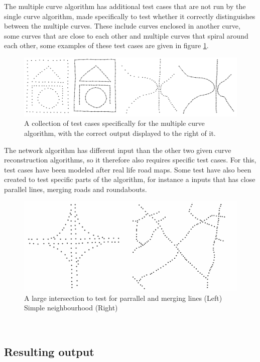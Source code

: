 \documentclass[11pt]{article}
\begin{document}
The multiple curve algorithm has additional test cases that are not run by the single curve algorithm, made specifically to test whether it correctly distinguishes between the multiple curves. These include curves enclosed in another curve, some curves that are close to each other and multiple curves that spiral around each other, some examples of these test cases are given in figure \ref{multi}.

\begin{figure}[ht!]
\centering
\includegraphics[scale=0.3]{multiInput.png}
\caption{A collection of test cases specifically for the multiple curve algorithm, with the correct output displayed to the right of it.}
\label{multi}
\end{figure}

The network algorithm has different input than the other two given curve reconstruction algorithms, so it therefore also requires specific test cases. For this, test cases have been modeled after real life road maps. Some test have also been created to test specific parts of the algorithm, for instance a inputs that has close parallel lines, merging roads and roundabouts.

\begin{figure}[ht!]
\centering
\includegraphics[scale=0.3]{networkInput.png}
\caption{A large intersection to test for parrallel and merging lines (Left) Simple neighbourhood (Right)}
\label{network}
\end{figure}$ $\\

\subsection{Resulting output}
\end{document}
